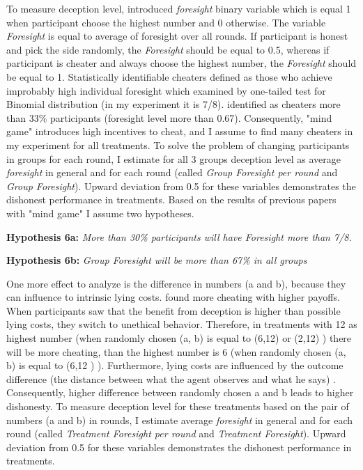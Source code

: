 \documentclass[12pt]{article}
\begin{document}
	To measure deception level, \cite{jiang2013cheating} introduced \textit{foresight} binary variable which is equal 1 when participant choose the highest number and 0 otherwise. The variable \textit{Foresight} is equal to average of foresight over all rounds. If participant is honest and pick the side randomly, the \textit{Foresight} should be equal to 0.5, whereas if participant is cheater and always choose the highest number, the \textit{Foresight} should be equal to 1. Statistically identifiable cheaters defined as those who achieve improbably high individual foresight which examined by one-tailed test for Binomial distribution (in my experiment it is 7/8). \cite{jiang2013cheating, mol2020not} identified as cheaters more than 33\% participants (foresight level more than 0.67). Consequently, "mind game" introduces high incentives to cheat, and I assume to find many cheaters in my experiment for all treatments. To solve the problem of changing participants in groups for each round, I estimate for all 3 groups deception level as average \textit{foresight} in general and for each round (called \textit{Group Foresight per round} and \textit{Group Foresight}). Upward deviation from 0.5 for these variables demonstrates the dishonest performance in treatments. Based on the results of previous papers with "mind game" I assume two hypotheses.
	
	\vspace{0.2cm}
	
	\textbf{Hypothesis 6a:}
	\textit{More than 30\% participants will have \textit{Foresight} more than 7/8.}
	
	\textbf{Hypothesis 6b:}
	\textit{Group Foresight will be more than 67\% in all groups}
	
	\vspace{0.2cm}
	
	One more effect to analyze is the difference in numbers (a and b), because they can influence to intrinsic lying costs. \cite{kajackaite2015lying} found more cheating with higher payoffs. When participants saw that the benefit from deception is higher than possible lying costs, they switch to unethical behavior. Therefore, in treatments with 12 as highest number (when randomly chosen (a, b) is equal to (6,12) or (2,12) ) there will be more cheating, than the highest number is 6 (when randomly chosen (a, b) is equal to (6,12 ) ). Furthermore, lying costs are influenced by the outcome difference (the distance between what the agent observes and what he says) \autocite{gneezy2018lying}. Consequently, higher difference between randomly chosen a and b leads to higher dishonesty. To measure deception level for these treatments based on the pair of numbers (a and b) in rounds, I estimate average \textit{foresight} in general and for each round (called \textit{Treatment Foresight per round} and \textit{Treatment Foresight}). Upward deviation from 0.5 for these variables demonstrates the dishonest performance in treatments. 
	
\end{document}
